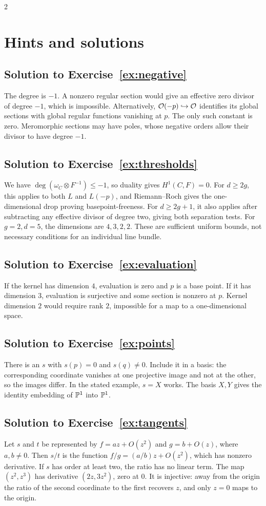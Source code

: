 \documentclass[12pt]{memoir}
\newcommand{\RRsolution}[1]{\subsection*{Solution to Exercise~\ref{#1}}\label{sol:#1}}
\begin{document}
\begin{multicols}{2}
\raggedcolumns
\section{Hints and solutions}\label{sec:solutions}

\RRsolution{ex:negative}
The degree is $-1$. A nonzero regular section would give an effective
zero divisor of degree $-1$, which is impossible. Alternatively,
$\mathcal{O}(-p)\hookrightarrow\mathcal{O}$ identifies its global sections with
global regular functions vanishing at $p$. The only such constant is
zero. Meromorphic sections may have poles, whose negative orders
allow their divisor to have degree $-1$.

\RRsolution{ex:thresholds}
We have
$\deg(\omega_C\otimes F^{-1})\le-1$, so duality gives $H^1(C,F)=0$.
For $d\ge2g$, this applies to both $L$ and $L(-p)$, and
Riemann--Roch gives the one-dimensional drop proving
basepoint-freeness. For $d\ge2g+1$, it also applies after subtracting
any effective divisor of degree two, giving both separation tests.
For $g=2,d=5$, the dimensions are $4,3,2,2$.
These are sufficient uniform bounds, not necessary conditions for
an individual line bundle.

\RRsolution{ex:evaluation}
If the kernel has dimension $4$, evaluation is zero and $p$ is a
base point. If it has dimension $3$, evaluation is surjective and
some section is nonzero at $p$. Kernel dimension $2$ would require
rank $2$, impossible for a map to a one-dimensional space.

\RRsolution{ex:points}
There is an $s$ with $s(p)=0$ and $s(q)\ne0$. Include it in a basis:
the corresponding coordinate vanishes at one projective image and
not at the other, so the images differ. In the stated example,
$s=X$ works. The basis $X,Y$ gives the identity embedding of
$\mathbb{P}^1$ into $\mathbb{P}^1$.

\RRsolution{ex:tangents}
Let $s$ and $t$ be represented by $f=az+O(z^2)$ and $g=b+O(z)$,
where $a,b\ne0$. Then $s/t$ is the function
$f/g=(a/b)z+O(z^2)$, which has nonzero derivative. If $s$ has order at
least two, the ratio has no linear term. The map $(z^2,z^3)$ has
derivative $(2z,3z^2)$, zero at $0$. It is injective: away from the
origin the ratio of the second coordinate to the first recovers
$z$, and only $z=0$ maps to the origin.


\end{multicols}
\end{document}

